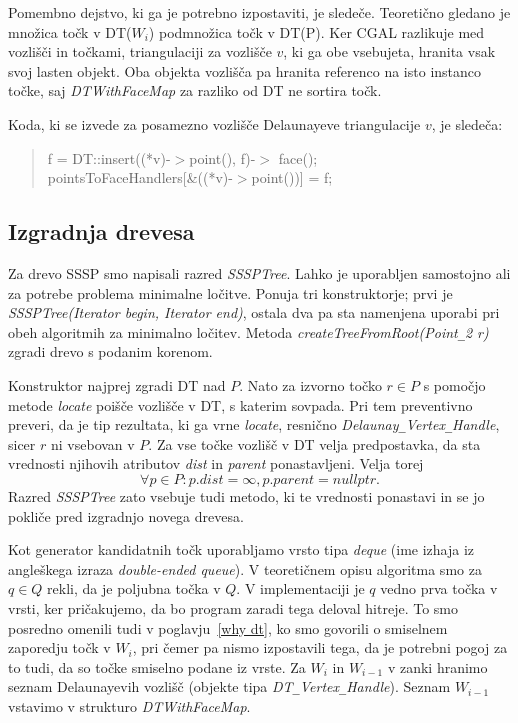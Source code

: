 \documentclass[a4paper, 12pt]{book}
\newcommand{\U}{\texttt{\_}}
\begin{document}
Pomembno dejstvo, ki ga je potrebno izpostaviti, je sledeče. Teoretično gledano je množica točk v DT($W_i$) podmnožica točk v DT(P). Ker CGAL razlikuje med vozlišči in točkami, triangulaciji za vozlišče $v$, ki ga obe vsebujeta, hranita vsak svoj lasten objekt. Oba objekta vozlišča pa hranita referenco na isto instanco točke, saj \textit{DTWithFaceMap} za razliko od DT ne sortira točk.

Koda, ki se izvede za posamezno vozlišče Delaunayeve triangulacije $v$, je sledeča:
\begin{quote}
f = DT::insert((*v)-$>$point(), f)-$>$ face();\\
pointsToFaceHandlers[\&((*v)-$>$point())] = f;
\end{quote}
\subsection{Izgradnja drevesa} 

Za drevo SSSP smo napisali razred \textit{SSSPTree}. Lahko je uporabljen samostojno ali za potrebe problema minimalne ločitve. Ponuja tri konstruktor\-je; prvi je \textit{SSSP\-Tree(Iterator begin, Iterator end)}, ostala dva pa sta namenje\-na uporabi pri obeh algoritmih za minimalno ločitev. Metoda \textit{createTreeFrom\-Ro\-ot\-(Point\U 2 r)} zgradi drevo s podanim korenom. 

Konstruktor najprej zgradi DT nad $P$. Nato za izvorno točko $r\in P$ s pomočjo metode \textit{locate} poišče vozlišče v DT, s katerim sovpada. Pri tem preventivno preveri, da je tip rezultata, ki ga vrne \textit{locate}, resnično \textit{Delaunay\U Ver\-tex\U Handle}, sicer $r$ ni vsebovan v $P$. Za vse točke vozlišč v DT velja predpostavka, da sta vrednosti njihovih atributov \textit{dist} in \textit{parent} ponastavljeni. Velja torej
\[
	\forall p\in P: p.dist = \infty,  p.parent = nullptr.
\]
Razred \textit{SSSPTree} zato vsebuje tudi metodo, ki te vrednosti ponastavi in se jo pokliče pred izgradnjo novega drevesa.

Kot generator kandidatnih točk uporabljamo vrsto tipa \textit{deque} (ime izhaja iz angleškega izraza \textit{double-ended queue}). V teoretičnem opisu algoritma smo za $q\in Q$ rekli, da je poljubna točka v $Q$. V implementaciji je $q$ vedno prva točka v vrsti, ker pričakujemo, da bo program zaradi tega deloval hitreje. To smo posredno omenili tudi v poglavju~\ref{why dt}, ko smo govorili o smiselnem zaporedju točk v $W_i$, pri čemer pa nismo izpostavili tega, da je potrebni pogoj za to tudi, da so točke smiselno podane iz vrste. Za $W_i$ in $W_{i-1}$ v zanki hranimo seznam Delaunayevih vozlišč (objekte tipa \textit{DT\U Vertex\U Handle}). Seznam $W_{i-1}$ vstavimo v strukturo \textit{DTWithFaceMap}. 
\end{document}
